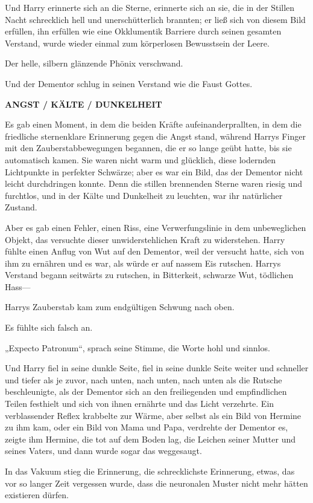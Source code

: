 {Und Harry erinnerte sich an die Sterne, erinnerte sich an sie, die in der Stillen Nacht schrecklich hell und unerschütterlich brannten; er ließ sich von diesem Bild erfüllen, ihn erfüllen wie eine Okklumentik Barriere durch seinen gesamten Verstand, wurde wieder einmal zum körperlosen Bewusstsein der Leere.

Der helle, silbern glänzende Phönix verschwand.

Und der Dementor schlug in seinen Verstand wie die Faust Gottes.

\textbf{\textbf{ANGST / KÄLTE / DUNKELHEIT}}

Es gab einen Moment, in dem die beiden Kräfte aufeinanderprallten, in dem die friedliche sternenklare Erinnerung gegen die Angst stand, während Harrys Finger mit den Zauberstabbewegungen begannen, die er so lange geübt hatte, bis sie automatisch kamen. Sie waren nicht warm und glücklich, diese lodernden Lichtpunkte in perfekter Schwärze; aber es war ein Bild, das der Dementor nicht leicht durchdringen konnte. Denn die stillen brennenden Sterne waren riesig und furchtlos, und in der Kälte und Dunkelheit zu leuchten, war ihr natürlicher Zustand.

Aber es gab einen Fehler, einen Riss, eine Verwerfungslinie in dem unbeweglichen Objekt, das versuchte dieser unwiderstehlichen Kraft zu widerstehen. Harry fühlte einen Anflug von Wut auf den Dementor, weil der versucht hatte, sich von ihm zu ernähren und es war, als würde er auf nassem Eis rutschen. Harrys Verstand begann seitwärts zu rutschen, in Bitterkeit, schwarze Wut, tödlichen Hass—

Harrys Zauberstab kam zum endgültigen Schwung nach oben.

Es fühlte sich falsch an.

„Expecto Patronum“, sprach seine Stimme, die Worte hohl und sinnlos.

Und Harry fiel in seine dunkle Seite, fiel in seine dunkle Seite weiter und schneller und tiefer als je zuvor, nach unten, nach unten, nach unten als die Rutsche beschleunigte, als der Dementor sich an den freiliegenden und empfindlichen Teilen festhielt und sich von ihnen ernährte und das Licht verzehrte. Ein verblassender Reflex krabbelte zur Wärme, aber selbst als ein Bild von Hermine zu ihm kam, oder ein Bild von Mama und Papa, verdrehte der Dementor es, zeigte ihm Hermine, die tot auf dem Boden lag, die Leichen seiner Mutter und seines Vaters, und dann wurde sogar das weggesaugt.

In das Vakuum stieg die Erinnerung, die schrecklichste Erinnerung, etwas, das vor so langer Zeit vergessen wurde, dass die neuronalen Muster nicht mehr hätten existieren dürfen.

}
